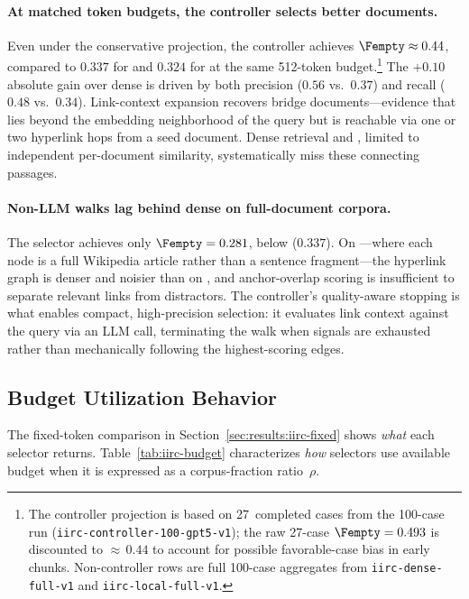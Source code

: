 \paragraph{At matched token budgets, the controller selects better documents.}
Even under the conservative projection, the controller achieves
$\Fempty \approx 0.44$, compared to $0.337$ for \seldense and $0.324$ for
\selmdrlight at the same 512-token budget.\footnote{%
  \label{fn:ctrl-proj}%
  The controller projection is based on 27~completed cases from the
  100-case run (\texttt{iirc-controller-100-gpt5-v1}); the raw 27-case
  $\Fempty = 0.493$ is discounted to ${\approx}\,0.44$ to account for
  possible favorable-case bias in early chunks.
  Non-controller rows are full 100-case aggregates from
  \texttt{iirc-dense-full-v1} and \texttt{iirc-local-full-v1}.}
The $+0.10$ absolute gain over dense is driven by both precision
($0.56$ vs.\ $0.37$) and recall ($0.48$ vs.\ $0.34$).
Link-context expansion recovers bridge documents---evidence that lies
beyond the embedding neighborhood of the query but is reachable via
one or two hyperlink hops from a seed document.
Dense retrieval and \selmdrlight, limited to independent per-document
similarity, systematically miss these connecting passages.

\paragraph{Non-LLM walks lag behind dense on full-document corpora.}
The \selwalk selector achieves only $\Fempty = 0.281$, below
\seldense ($0.337$).
On \IIRC---where each node is a full Wikipedia article rather than a
sentence fragment---the hyperlink graph is denser and noisier than on
\TwoWikiShort, and anchor-overlap scoring is insufficient to separate
relevant links from distractors.
The controller's quality-aware stopping is what enables compact,
high-precision selection: it evaluates link context against the query
via an LLM call, terminating the walk when signals are exhausted rather
than mechanically following the highest-scoring edges.

\subsection{Budget Utilization Behavior}
\label{sec:results:iirc-ratio}

The fixed-token comparison in Section~\ref{sec:results:iirc-fixed}
shows \emph{what} each selector returns.
Table~\ref{tab:iirc-budget} characterizes \emph{how} selectors use
available budget when it is expressed as a corpus-fraction ratio~$\rho$.

